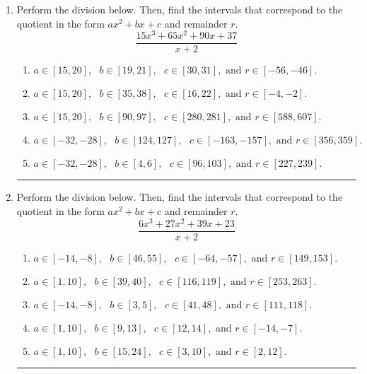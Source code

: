 \documentclass[14pt]{extbook}
\newcommand{\litem}[1]{\item#1\hspace*{-1cm}\rule{\textwidth}{0.4pt}}
\begin{document}
\begin{enumerate}
{\begin{enumerate}[label=\Alph*.]
\end{enumerate} }
\litem{
Perform the division below. Then, find the intervals that correspond to the quotient in the form $ax^2+bx+c$ and remainder $r$.\[ \frac{15x^{3} +65 x^{2} +90 x + 37}{x + 2} \]\begin{enumerate}[label=\Alph*.]
\item \( a \in [15, 20], \text{   } b \in [19, 21], \text{   } c \in [30, 31], \text{   and   } r \in [-56, -46]. \)
\item \( a \in [15, 20], \text{   } b \in [35, 38], \text{   } c \in [16, 22], \text{   and   } r \in [-4, -2]. \)
\item \( a \in [15, 20], \text{   } b \in [90, 97], \text{   } c \in [280, 281], \text{   and   } r \in [588, 607]. \)
\item \( a \in [-32, -28], \text{   } b \in [124, 127], \text{   } c \in [-163, -157], \text{   and   } r \in [356, 359]. \)
\item \( a \in [-32, -28], \text{   } b \in [4, 6], \text{   } c \in [96, 103], \text{   and   } r \in [227, 239]. \)

\end{enumerate} }
\litem{
Perform the division below. Then, find the intervals that correspond to the quotient in the form $ax^2+bx+c$ and remainder $r$.\[ \frac{6x^{3} +27 x^{2} +39 x + 23}{x + 2} \]\begin{enumerate}[label=\Alph*.]
\item \( a \in [-14, -8], \text{   } b \in [46, 55], \text{   } c \in [-64, -57], \text{   and   } r \in [149, 153]. \)
\item \( a \in [1, 10], \text{   } b \in [39, 40], \text{   } c \in [116, 119], \text{   and   } r \in [253, 263]. \)
\item \( a \in [-14, -8], \text{   } b \in [3, 5], \text{   } c \in [41, 48], \text{   and   } r \in [111, 118]. \)
\item \( a \in [1, 10], \text{   } b \in [9, 13], \text{   } c \in [12, 14], \text{   and   } r \in [-14, -7]. \)
\item \( a \in [1, 10], \text{   } b \in [15, 24], \text{   } c \in [3, 10], \text{   and   } r \in [2, 12]. \)


\end{enumerate}}
\end{enumerate}
\end{document}

